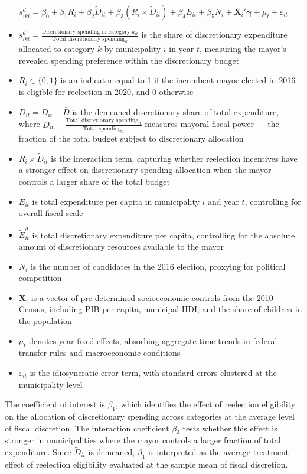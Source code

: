 \documentclass[12pt, a4paper]{article}
\begin{document}
\begin{equation}
    s^{d}_{ikt} = \beta_0
                + \beta_1 R_i
                + \beta_2 \tilde{D}_{it}
                + \beta_3 (R_i \times \tilde{D}_{it})
                + \beta_4 E_{it}
                + \beta_5 N_i
                + \mathbf{X}_i'\boldsymbol{\gamma}
                + \mu_t
                + \varepsilon_{it}
\end{equation}

\begin{itemize}
    \item $s^{d}_{ikt} = \frac{\text{Discretionary spending in category } k_{it}}{\text{Total discretionary spending}_{it}}$ is the share of discretionary expenditure allocated to category $k$ by municipality $i$ in year $t$, measuring the mayor's revealed spending preference within the discretionary budget
    \item $R_i \in \{0,1\}$ is an indicator equal to 1 if the incumbent mayor elected in 2016 is eligible for reelection in 2020, and 0 otherwise
    \item $\tilde{D}_{it} = D_{it} - \bar{D}$ is the demeaned discretionary share of total expenditure, where $D_{it} = \frac{\text{Total discretionary spending}_{it}}{\text{Total spending}_{it}}$ measures mayoral fiscal power --- the fraction of the total budget subject to discretionary allocation
    \item $R_i \times \tilde{D}_{it}$ is the interaction term, capturing whether reelection incentives have a stronger effect on discretionary spending allocation when the mayor controls a larger share of the total budget
    \item $E_{it}$ is total expenditure per capita in municipality $i$ and year $t$, controlling for overall fiscal scale
    \item $\tilde{E}^{d}_{it}$ is total discretionary expenditure per capita, controlling for the absolute amount of discretionary resources available to the mayor
    \item $N_i$ is the number of candidates in the 2016 election, proxying for political competition
    \item $\mathbf{X}_i$ is a vector of pre-determined socioeconomic controls from the 2010 Census, including PIB per capita, municipal HDI, and the share of children in the population
    \item $\mu_t$ denotes year fixed effects, absorbing aggregate time trends in federal transfer rules and macroeconomic conditions
    \item $\varepsilon_{it}$ is the idiosyncratic error term, with standard errors clustered at the municipality level
\end{itemize}

The coefficient of interest is $\beta_1$, which identifies the effect of reelection eligibility on the allocation of discretionary spending across categories at the average level of fiscal discretion. The interaction coefficient $\beta_3$ tests whether this effect is stronger in municipalities where the mayor controls a larger fraction of total expenditure. Since $\tilde{D}_{it}$ is demeaned, $\beta_1$ is interpreted as the average treatment effect of reelection eligibility evaluated at the sample mean of fiscal discretion.
\end{document}
